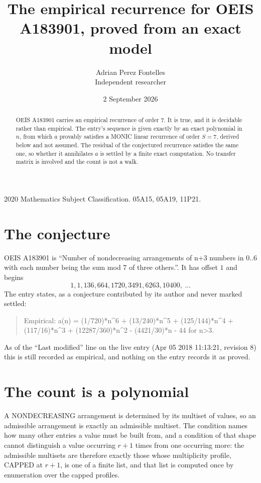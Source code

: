 \documentclass[11pt,a4paper]{article}
\title{The empirical recurrence for OEIS A183901, proved from an exact model}
\author{Adrian Perez Fontelles\\ \small Independent researcher}
\date{2 September 2026}
\theoremstyle{plain}
\theoremstyle{definition}
\begin{document}
\maketitle

\begin{abstract}
OEIS A183901 carries an empirical recurrence of order $7$. It is true, and it is
decidable rather than empirical. The entry's sequence is given exactly by an exact polynomial in $n$, from
which $a$ provably satisfies a MONIC linear recurrence of order $S=7$, derived below and not
assumed. The residual of the conjectured recurrence satisfies the same one, so whether it
annihilates $a$ is settled by a finite exact computation. No transfer matrix is involved and
the count is not a walk.
\end{abstract}

\noindent\small 2020 Mathematics Subject Classification. 05A15, 05A19, 11P21.\normalsize

\section{The conjecture}

OEIS A183901 is ``Number of nondecreasing arrangements of n+3 numbers in 0..6 with each number being the sum mod 7 of three others.''. It has offset $1$ and begins
\[
1, 1, 136, 664, 1720, 3491, 6263, 10400,\ \dots
\]
The entry states, as a conjecture contributed by its author and never marked settled:
\begin{quote}
Empirical: a(n) = (1/720)*n\^{}6 + (13/240)*n\^{}5 + (125/144)*n\^{}4 + (117/16)*n\^{}3 + (12287/360)*n\^{}2 - (4421/30)*n - 44 for n>3.
\end{quote}
As of the ``Last modified'' line on the live entry (Apr 05 2018 11:13:21, revision 8)
this is still recorded as empirical, and nothing on the entry records it as proved.

\section{The count is a polynomial}

A NONDECREASING arrangement is determined by its multiset of values, so an admissible
arrangement is exactly an admissible multiset. The condition names how many other entries a
value must be built from, and a condition of that shape cannot distinguish a value occurring
$r+1$ times from one occurring more: the admissible multisets are therefore exactly those
whose multiplicity profile, CAPPED at $r+1$, is one of a finite list, and that list is computed
once by enumeration over the capped profiles.
\end{document}
